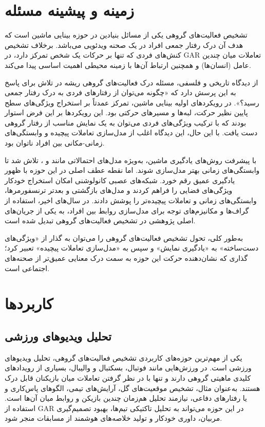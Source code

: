 \documentclass[12pt]{report}
\begin{document}
\section{زمینه و پیشینه مسئله}
تشخیص فعالیت‌های گروهی  یکی از مسائل بنیادین در حوزه بینایی ماشین است که هدف آن درک رفتار جمعی افراد در یک صحنه ویدئویی می‌باشد. برخلاف تشخیص کنش‌های فردی که تنها بر حرکات یک شخص تمرکز دارد، در GAR تعاملات میان چندین عامل (انسان‌ها) و همچنین ارتباط آن‌ها با زمینه محیطی اهمیت اساسی پیدا می‌کند.

از دیدگاه تاریخی و فلسفی، مسئله درک فعالیت‌های گروهی ریشه در تلاش برای پاسخ به این پرسش دارد که «چگونه می‌توان از رفتارهای فردی به درک رفتار جمعی رسید؟». در رویکردهای اولیه بینایی ماشین، تمرکز عمدتاً بر استخراج ویژگی‌های سطح پایین نظیر حرکت، لبه‌ها و مسیرهای حرکتی بود. این رویکردها بر این فرض استوار بودند که با ترکیب ویژگی‌های فردی می‌توان به یک نمایش مناسب از رفتار گروهی دست یافت. با این حال، این دیدگاه اغلب از مدل‌سازی تعاملات پیچیده و وابستگی‌های زمانی-مکانی بین افراد ناتوان بود.

با پیشرفت روش‌های یادگیری ماشین، به‌ویژه مدل‌های احتمالاتی مانند  و ، تلاش شد تا وابستگی‌های زمانی بهتر مدل‌سازی شوند. اما نقطه عطف اصلی در این حوزه با ظهور یادگیری عمیق رقم خورد. شبکه‌های عصبی کانولوشنی امکان استخراج خودکار ویژگی‌های فضایی را فراهم کردند و مدل‌های بازگشتی و بعدتر ترنسفورمرها، وابستگی‌های زمانی و تعاملات پیچیده‌تر را پوشش دادند. در سال‌های اخیر، استفاده از گراف‌ها و مکانیزم‌های توجه برای مدل‌سازی روابط بین افراد، به یکی از جریان‌های اصلی پژوهشی در تشخیص فعالیت‌های گروهی تبدیل شده است.

به‌طور کلی، تحول تشخیص فعالیت‌های گروهی را می‌توان به گذار از «ویژگی‌های دست‌ساخته» به «یادگیری نمایش» و سپس به «مدل‌سازی تعاملات پیچیده» تعبیر کرد؛ گذاری که نشان‌دهنده حرکت این حوزه به سمت درک معنایی عمیق‌تر از صحنه‌های اجتماعی است.

\section{کاربردها}
\subsection{تحلیل ویدیوهای ورزشی}
یکی از مهم‌ترین حوزه‌های کاربردی تشخیص فعالیت‌های گروهی، تحلیل ویدیوهای ورزشی است. در ورزش‌هایی مانند فوتبال، بسکتبال و والیبال، بسیاری از رویدادهای کلیدی ماهیتی گروهی دارند و تنها با در نظر گرفتن تعاملات میان بازیکنان قابل درک هستند. به‌عنوان مثال، تشخیص موقعیت‌های گل، آرایش‌های تیمی، الگوهای پاس‌کاری و یا رفتارهای دفاعی، نیازمند تحلیل هم‌زمان چندین بازیکن و روابط میان آن‌ها است. استفاده از GAR در این حوزه می‌تواند به تحلیل تاکتیکی تیم‌ها، بهبود تصمیم‌گیری مربیان، داوری خودکار و تولید خلاصه‌های هوشمند از مسابقات منجر شود.
\end{document}
